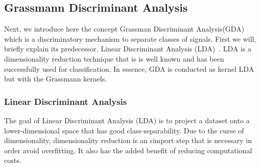 \subsection{Grassmann Discriminant Analysis}
Next, we introduce here the concept Grassman Discriminant Analysis(GDA)\cite{Hamm2008GrassmannLearning} which is a discriminatory mechanism to separate classes of signals. First we will, briefly explain its predecessor, Linear Discriminant Analysis (LDA)~\cite{fukunaga1990statistical}. LDA is a dimensionality reduction technique that is is well known and has been successfully used for classification. In essence, GDA is conducted as kernel LDA but with the Grassmann kernels.

\subsubsection{Linear Discriminant Analysis}
The goal of Linear Discriminant Analysis (LDA) is to project a dataset onto a lower-dimensional space that has good class-separability. Due to the curse of dimensionality, dimensionality reduction is an simport step that is necessary in order avoid overfitting. It also has the added benefit of reducing computational costs.

